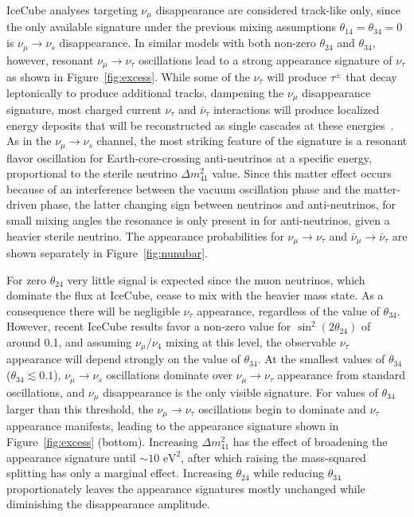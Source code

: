\documentclass[main.tex]{subfiles}
\begin{document}
IceCube analyses targeting $\nu_\mu$ disappearance are considered track-like only, since the only available signature under the previous mixing assumptions $\theta_{14}=\theta_{34}=0$ is $\nu_\mu\rightarrow\nu_s$ disappearance.  In similar models with both non-zero $\theta_{24}$ and $\theta_{34}$, however, resonant $\nu_{\mu}\rightarrow\nu_{\tau}$ oscillations lead to a strong appearance signature of $\nu_{\tau}$ as shown in Figure~\ref{fig:excess}. While some of the $\nu_{\tau}$ will produce $\tau^{\pm}$ that decay leptonically to produce additional tracks, dampening the $\nu_\mu$ disappearance signature, most charged current $\nu_\tau$ and $\bar{\nu}_\tau$ interactions will produce localized energy deposits that will be reconstructed as single cascades at these energies~\cite{abbasi2020measurement}. 
As in the $\nu_\mu\rightarrow\nu_s$ channel, the most striking feature of the signature is a resonant flavor oscillation for Earth-core-crossing anti-neutrinos at a specific energy, proportional to the sterile neutrino $\Delta m^2_{41}$ value.  Since this matter effect occurs because of an interference between the vacuum oscillation phase and the matter-driven phase, the latter changing sign between neutrinos and anti-neutrinos, for small mixing angles the resonance is only present in for anti-neutrinos, given a heavier sterile neutrino.  The appearance probabilities for $\nu_\mu\rightarrow\nu_{\tau}$ and $\bar{\nu}_\mu\rightarrow\bar{\nu}_{\tau}$ are shown separately in Figure~\ref{fig:nunubar}. 

For zero $\theta_{24}$ very little signal is expected since the muon neutrinos, which dominate the flux at IceCube, cease to mix with the heavier mass state. As a consequence there will be negligible $\nu_\tau$ appearance, regardless of the value of $\theta_{34}$.  However, recent IceCube results favor a non-zero value for $\sin^2(2\theta_{24})$ of around 0.1, and assuming $\nu_\mu / \nu_4$ mixing at this level, the observable $\nu_\tau$ appearance will depend strongly on the value of $\theta_{34}$.  At the smallest values of $\theta_{34}$ ($\theta_{34}\lesssim 0.1 $), $\nu_{\mu}\to\nu_{s}$ oscillations dominate over $\nu_{\mu}\to\nu_{\tau}$ appearance from standard oscillations, and $\nu_\mu$ disappearance is the only visible signature. For values of $\theta_{34}$ larger than this threshold, the $\nu_{\mu}\to\nu_{\tau}$ oscillations begin to dominate and $\nu_{\tau}$ appearance manifests, leading to the appearance signature shown in Figure~\ref{fig:excess} (bottom). Increasing $\Delta m_{41}^{2}$ has the effect of broadening the appearance signature until $\sim 10\text{ eV}^{2}$, after which raising the mass-squared splitting has only a marginal effect. Increasing $\theta_{24}$ while reducing $\theta_{34}$ proportionately leaves the appearance signatures mostly unchanged while diminishing the disappearance amplitude.  
\end{document}
